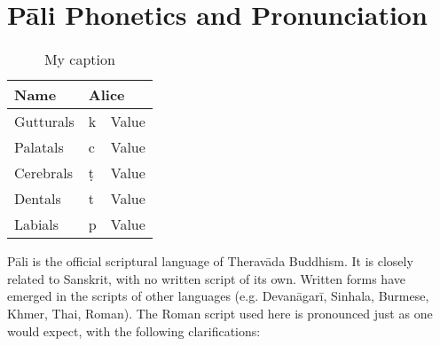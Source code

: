 \section{Pāli Phonetics and Pronunciation}
\label{phonetics}




\begin{table}[]
\centering
\caption{My caption}
\label{my-label}
\begin{tabular}{|l|l|l|}
\hline
Name       & \multicolumn{2}{l|}{Alice}  \\ \hline
Gutturals  & k & Value       \\ \hline%
Palatals   & c & Value       \\ \hline%
Cerebrals  & ṭ & Value       \\ \hline
Dentals    & t & Value       \\ \hline
Labials    & p & Value       \\ \hline
\end{tabular}
\end{table}

\begin{justify}
  Pāli is the official scriptural language of Theravāda Buddhism. It is closely related to Sanskrit, with no written script of its own. Written forms have emerged in the scripts of other languages (e.g. Devanāgarī, Sinhala, Burmese, Khmer, Thai, Roman). The Roman script used here is pronounced just as one would expect, with the following clarifications:
\end{justify}

